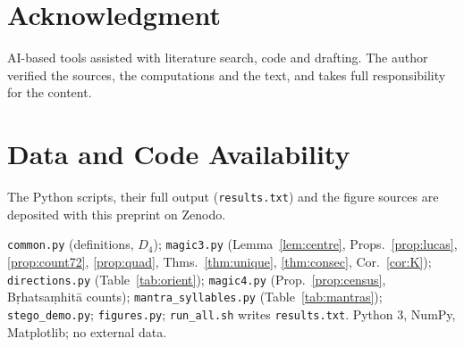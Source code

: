 \documentclass[journal]{IEEEtran}
\theoremstyle{definition}
\begin{document}
\section*{Acknowledgment}
AI-based tools assisted with literature search, code and drafting. The author verified the sources, the computations and the text, and takes full responsibility for the content.

\section*{Data and Code Availability}
The Python scripts, their full output (\texttt{results.txt}) and the figure sources are deposited with this preprint on Zenodo.

\appendix[Reproducibility]
\texttt{common.py} (definitions, $D_4$); \texttt{magic3.py} (Lemma~\ref{lem:centre}, Props.~\ref{prop:lucas}, \ref{prop:count72}, \ref{prop:quad}, Thms.~\ref{thm:unique}, \ref{thm:consec}, Cor.~\ref{cor:K}); \texttt{directions.py} (Table~\ref{tab:orient}); \texttt{magic4.py} (Prop.~\ref{prop:census}, B\d rhatsa\d mhit\=a counts); \texttt{mantra\_syllables.py} (Table~\ref{tab:mantras}); \texttt{stego\_demo.py}; \texttt{figures.py}; \texttt{run\_all.sh} writes \texttt{results.txt}. Python 3, NumPy, Matplotlib; no external data.



\end{document}
